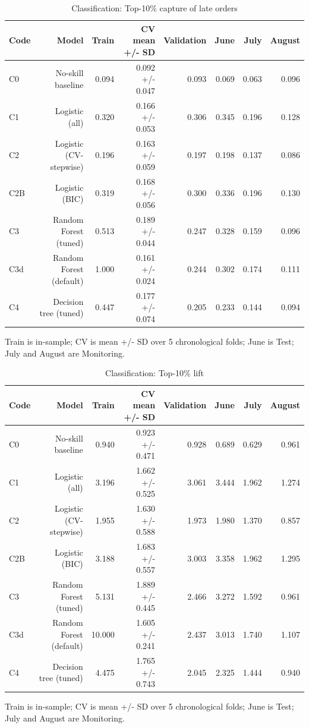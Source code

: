\begin{table}[htbp]
\centering
\small
\caption{Classification: Top-10\% capture of late orders}
\begin{tabular}{lrrrrrrr}
\toprule
Code & Model & Train & CV mean +/- SD & Validation & June & July & August \\
\midrule
C0 & No-skill baseline & 0.094 & 0.092 +/- 0.047 & 0.093 & 0.069 & 0.063 & 0.096 \\
C1 & Logistic (all) & 0.320 & 0.166 +/- 0.053 & 0.306 & 0.345 & 0.196 & 0.128 \\
C2 & Logistic (CV-stepwise) & 0.196 & 0.163 +/- 0.059 & 0.197 & 0.198 & 0.137 & 0.086 \\
C2B & Logistic (BIC) & 0.319 & 0.168 +/- 0.056 & 0.300 & 0.336 & 0.196 & 0.130 \\
C3 & Random Forest (tuned) & 0.513 & 0.189 +/- 0.044 & 0.247 & 0.328 & 0.159 & 0.096 \\
C3d & Random Forest (default) & 1.000 & 0.161 +/- 0.024 & 0.244 & 0.302 & 0.174 & 0.111 \\
C4 & Decision tree (tuned) & 0.447 & 0.177 +/- 0.074 & 0.205 & 0.233 & 0.144 & 0.094 \\
\bottomrule
\end{tabular}
\par\smallskip\begin{minipage}{\linewidth}\footnotesize Train is in-sample; CV is mean +/- SD over 5 chronological folds; June is Test; July and August are Monitoring.\end{minipage}
\end{table}


\begin{table}[htbp]
\centering
\small
\caption{Classification: Top-10\% lift}
\begin{tabular}{lrrrrrrr}
\toprule
Code & Model & Train & CV mean +/- SD & Validation & June & July & August \\
\midrule
C0 & No-skill baseline & 0.940 & 0.923 +/- 0.471 & 0.928 & 0.689 & 0.629 & 0.961 \\
C1 & Logistic (all) & 3.196 & 1.662 +/- 0.525 & 3.061 & 3.444 & 1.962 & 1.274 \\
C2 & Logistic (CV-stepwise) & 1.955 & 1.630 +/- 0.588 & 1.973 & 1.980 & 1.370 & 0.857 \\
C2B & Logistic (BIC) & 3.188 & 1.683 +/- 0.557 & 3.003 & 3.358 & 1.962 & 1.295 \\
C3 & Random Forest (tuned) & 5.131 & 1.889 +/- 0.445 & 2.466 & 3.272 & 1.592 & 0.961 \\
C3d & Random Forest (default) & 10.000 & 1.605 +/- 0.241 & 2.437 & 3.013 & 1.740 & 1.107 \\
C4 & Decision tree (tuned) & 4.475 & 1.765 +/- 0.743 & 2.045 & 2.325 & 1.444 & 0.940 \\
\bottomrule
\end{tabular}
\par\smallskip\begin{minipage}{\linewidth}\footnotesize Train is in-sample; CV is mean +/- SD over 5 chronological folds; June is Test; July and August are Monitoring.\end{minipage}
\end{table}


